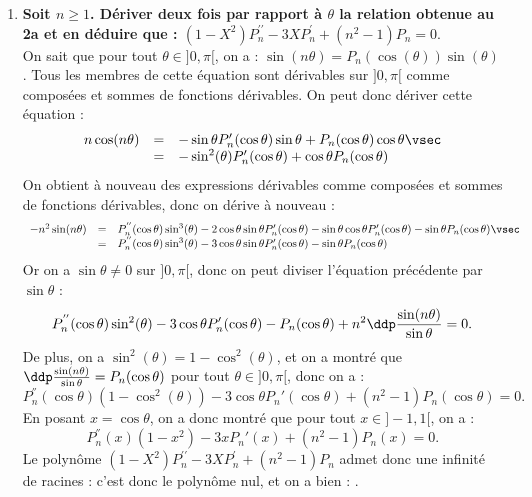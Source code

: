 \documentclass[a4paper, 11pt,reqno]{article}
\begin{document}
\begin{correction}
\begin{enumerate}
\begin{enumerate}
			            Comme $\theta \in ]0, \pi[$, on a $\sin \theta \not=0$, donc on a $P_n(\cos \theta) = \ddp \frac{\sin(n\theta)}{\sin \theta}$. D'apr\`es la factorisation de $P_n$, on a donc bien :
			            $$\fbox{$\ddp \frac{\sin(n\theta)}{\sin \theta}=2^{n-1}\prod\limits_{k=1}^{n-1}\left( \cos{(\theta)}-\cos{\left( \ddp\frac{k\pi}{n}\right) } \right).$}$$
		      \end{enumerate}
		\item \textbf{Soit $n\geq 1$. D\'eriver deux fois par rapport \`a $\theta$ la relation obtenue au 2a et en d\'eduire que : $(1-X^2)P^{\prime\prime}_n-3XP_n^{\prime}+(n^2-1)P_n=0.$}\\
		      On sait que pour tout $\theta \in ]0, \pi[$, on a : $\sin{(n\theta)}=P_n(\cos{(\theta)})\sin{(\theta)}$. Tous les membres de cette \'equation sont d\'erivables sur $]0,\pi[$ comme compos\'ees et sommes de fonctions d\'erivables. On peut donc d\'eriver cette \'equation :
					      $$\begin{array}{rcl}
							      n \cos(n \theta) & = & -\sin \theta P'_n(\cos\theta) \sin \theta + P_n(\cos \theta) \cos \theta\vsec \\
							                       & = & - \sin^2(\theta)  P'_n(\cos \theta) + \cos \theta P_n(\cos \theta)
						      \end{array}$$
					      On obtient \`a nouveau des expressions d\'erivables comme compos\'ees et sommes de fonctions d\'erivables, donc on d\'erive \`a nouveau :
					      $$\begin{array}{rcl}
							      -n^2 \sin(n \theta) & = & P_n^{''}(\cos \theta) \sin^3(\theta) - 2\cos \theta \sin \theta P_n'(\cos \theta) - \sin \theta \cos \theta P'_n(\cos \theta) - \sin \theta P_n(\cos \theta)\vsec \\
							                          & = & P_n^{''}(\cos \theta) \sin^3(\theta) - 3 \cos \theta \sin \theta P_n'(\cos \theta) - \sin \theta P_n(\cos \theta)
						      \end{array}$$
					      Or on a $\sin \theta \not=0$ sur $]0, \pi[$, donc on peut diviser l'\'equation pr\'ec\'edente par $\sin \theta$ :
		      $$P_n^{''}(\cos \theta) \sin^2(\theta) - 3 \cos \theta P_n'(\cos \theta) - P_n(\cos \theta) + n^2 \ddp\frac{\sin(n \theta)}{\sin \theta}=0.$$
		      De plus, on a $\sin^2(\theta) = 1-\cos^2(\theta)$, et on a montr\'e que $\ddp \frac{\sin(n \theta)}{\sin \theta} = P_n(\cos \theta)$ pour tout $\theta \in ]0, \pi[$, donc on a :
		      $$P_n^{''}(\cos \theta) (1-\cos^2(\theta)) - 3 \cos \theta P_n'(\cos \theta) +(n^2-1) P_n(\cos \theta) =0 .$$
		      En posant $x=\cos \theta$, on a donc montr\'e que pour tout $x \in ]-1,1[$, on a :
		      $$P_n^{''}(x) (1-x^2) - 3 x P_n'(x) +(n^2-1) P_n(x) =0.$$
		      Le polyn\^ome $(1-X^2)P^{\prime\prime}_n-3XP_n^{\prime}+(n^2-1)P_n$ admet donc une infinit\'e de racines : c'est donc le polyn\^ome nul, et on a bien : .
	\end{enumerate}
\end{correction}
\end{document}

